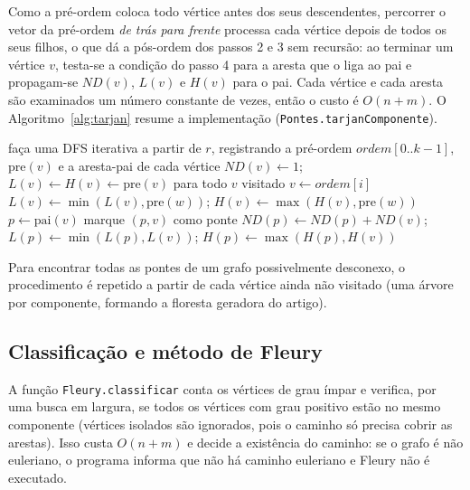 \documentclass[a4paper,11pt]{article}
\begin{document}
Como a pré-ordem coloca todo vértice antes dos seus descendentes, percorrer o vetor da pré-ordem
\emph{de trás para frente} processa cada vértice depois de todos os seus filhos, o que dá a pós-ordem
dos passos 2 e 3 sem recursão: ao terminar um vértice $v$, testa-se a condição do passo 4 para a aresta
que o liga ao pai e propagam-se $ND(v)$, $L(v)$ e $H(v)$ para o pai. Cada vértice e cada aresta são
examinados um número constante de vezes, então o custo é $O(n+m)$. O Algoritmo~\ref{alg:tarjan}
resume a implementação (\texttt{Pontes.tarjanComponente}).

\begin{algorithm}[H]
\caption{Pontes pelo método de Tarjan (1974), para o componente de $r$}\label{alg:tarjan}
\begin{algorithmic}[1]
\State faça uma DFS iterativa a partir de $r$, registrando a pré-ordem $\mathit{ordem}[0..k-1]$,
       $\mathrm{pre}(v)$ e a aresta-pai de cada vértice
\State $ND(v)\gets 1$; $L(v)\gets H(v)\gets\mathrm{pre}(v)$ para todo $v$ visitado
  \State $v \gets \mathit{ordem}[i]$
     \State $L(v)\gets\min(L(v),\mathrm{pre}(w))$; \quad $H(v)\gets\max(H(v),\mathrm{pre}(w))$
  \EndFor
     \State $p \gets \mathrm{pai}(v)$
      marque $(p,v)$ como ponte \EndIf
     \State $ND(p)\gets ND(p)+ND(v)$; \quad $L(p)\gets\min(L(p),L(v))$; \quad $H(p)\gets\max(H(p),H(v))$
  \EndIf
\EndFor
\end{algorithmic}
\end{algorithm}

Para encontrar todas as pontes de um grafo possivelmente desconexo, o procedimento é repetido a partir
de cada vértice ainda não visitado (uma árvore por componente, formando a floresta geradora do artigo).

\subsection{Classificação e método de Fleury}

A função \texttt{Fleury.classificar} conta os vértices de grau ímpar e verifica, por uma busca em
largura, se todos os vértices com grau positivo estão no mesmo componente (vértices isolados são
ignorados, pois o caminho só precisa cobrir as arestas). Isso custa $O(n+m)$ e decide a existência
do caminho: se o grafo é não euleriano, o programa informa que não há caminho euleriano e Fleury não é
executado.
\end{document}
